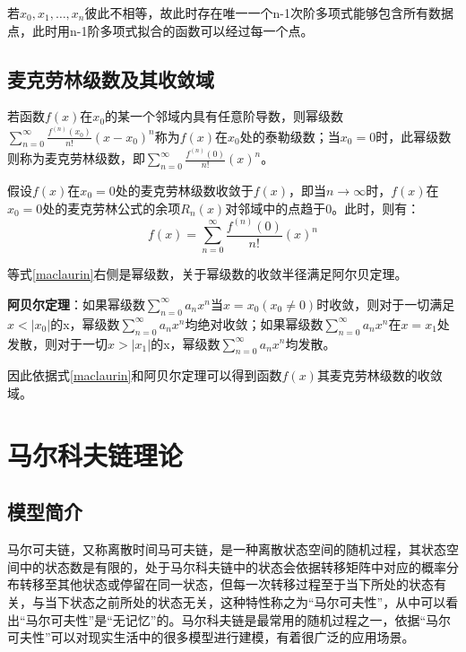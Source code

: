 若$x_0,x_1,…,x_n$彼此不相等，故此时存在唯一一个n-1次阶多项式能够包含所有数据点，此时用n-1阶多项式拟合的函数可以经过每一个点。

\subsection{麦克劳林级数及其收敛域}
若函数$f(x)$在$x_0$的某一个邻域内具有任意阶导数，则幂级数$\sum_{n=0}^{\infty}{\frac{f^{\left( n \right)}\left( x_0 \right)}{n!}}\left( x-x_0 \right) ^n$称为$f(x)$在$x_0$处的泰勒级数；当$x_0=0$时，此幂级数则称为麦克劳林级数，即$\sum_{n=0}^{\infty}{\frac{f^{\left( n \right)}\left( 0 \right)}{n!}}\left( x \right) ^n$。

假设$f(x)$在$x_0=0$处的麦克劳林级数收敛于$f(x)$，即当$n\rightarrow \infty $时，$f(x)$在$x_0=0$处的麦克劳林公式的余项$R_n(x)$对邻域中的点趋于0。此时，则有：
\begin{equation}
\label{maclaurin}
f\left( x \right) =\sum_{n=0}^{\infty}{\frac{f^{\left( n \right)}\left( 0 \right)}{n!}}\left( x \right) ^n
\end{equation}

等式\ref{maclaurin}右侧是幂级数，关于幂级数的收敛半径满足阿尔贝定理。

\textbf{阿贝尔定理}：如果幂级数$\sum_{n=0}^{\infty}{a_nx^n}$当$x=x_0(x_0 \ne 0)$时收敛，则对于一切满足$x<|x_0|$的x，幂级数$\sum_{n=0}^{\infty}{a_nx^n}$均绝对收敛；如果幂级数$\sum_{n=0}^{\infty}{a_nx^n}$在$x=x_1$处发散，则对于一切$x>|x_1|$的x，幂级数$\sum_{n=0}^{\infty}{a_nx^n}$均发散。

因此依据式\ref{maclaurin}和阿贝尔定理可以得到函数$f(x)$其麦克劳林级数的收敛域。


\section{马尔科夫链理论}

\subsection{模型简介}

马尔可夫链，又称离散时间马可夫链，是一种离散状态空间的随机过程，其状态空间中的状态数是有限的，处于马尔科夫链中的状态会依据转移矩阵中对应的概率分布转移至其他状态或停留在同一状态，但每一次转移过程至于当下所处的状态有关，与当下状态之前所处的状态无关，这种特性称之为“马尔可夫性”，从中可以看出“马尔可夫性”是“无记忆”的。马尔科夫链是最常用的随机过程之一，依据“马尔可夫性”可以对现实生活中的很多模型进行建模，有着很广泛的应用场景。

